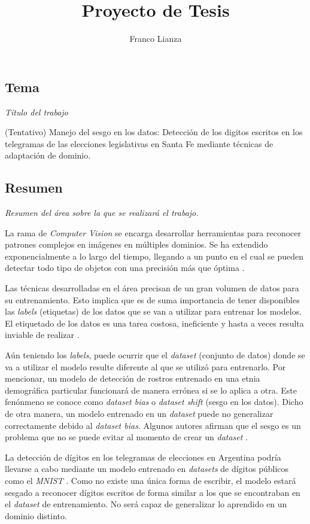 \documentclass[a4paper, twoside]{report}
\title{Proyecto de Tesis}
\author{Franco Lianza}
\begin{document}

\newpage

\subsection*{Tema}
{\it Título del trabajo}

(Tentativo) Manejo del sesgo en los datos: Detecci\'on de los digitos escritos en los
telegramas de las elecciones legislativas en Santa Fe mediante t\'ecnicas de
adaptaci\'on de dominio.

\subsection*{Resumen}
{\it Resumen del área sobre la que se realizará el trabajo.}

La rama de {\it Computer Vision} se encarga desarrollar herramientas para
reconocer patrones complejos en im\'agenes en m\'ultiples dominios. Se ha
extendido exponencialmente a lo largo del tiempo, llegando a un punto en el
cual se pueden detectar todo tipo de objetos con una precisi\'on m\'as que
\'optima \cite{szeliski2010computer}.

Las t\'ecnicas desarrolladas en el \'area precisan de un gran volumen de datos
para su entrenamiento. Esto implica que es de suma importancia de tener
disponibles las {\it labels} (etiquetas) de los datos que se van a utilizar
para entrenar los modelos. El etiquetado de los datos es una tarea costosa,
ineficiente y hasta a veces resulta inviable de realizar \cite{reis2022data}.

A\'un teniendo los {\it labels}, puede ocurrir que el {\it dataset} (conjunto
de datos) donde se va a utilizar el modelo resulte diferente al que se utilizó
para entrenarlo. Por mencionar, un modelo de detecci\'on de rostros entrenado
en una etnia demogr\'afica particular funcionar\'a de manera err\'onea si se lo
aplica a otra. Este fen\'onmeno se conoce como {\it dataset bias} o {\it
		dataset shift} (sesgo en los datos). Dicho de otra manera, un modelo entrenado
en un {\it dataset} puede no generalizar correctamente debido al {\it dataset
		bias}. Algunos autores afirman que el sesgo es un problema que no se puede
evitar al momento de crear un {\it dataset} \cite{khosla2012undoing}.

La detecci\'on de d\'igitos en los telegramas de elecciones en Argentina
podr\'ia llevarse a cabo mediante un modelo entrenado en {\it datasets} de
d\'igitos p\'ublicos como el {\it MNIST} \cite{lecun1998gradient}. Como no
existe una \'unica forma de escribir, el modelo estar\'a sesgado a reconocer
d\'igitos escritos de forma similar a los que se encontraban en el {\it
		dataset} de entrenamiento. No ser\'a capaz de generalizar lo aprendido en un
dominio distinto.
\end{document}
